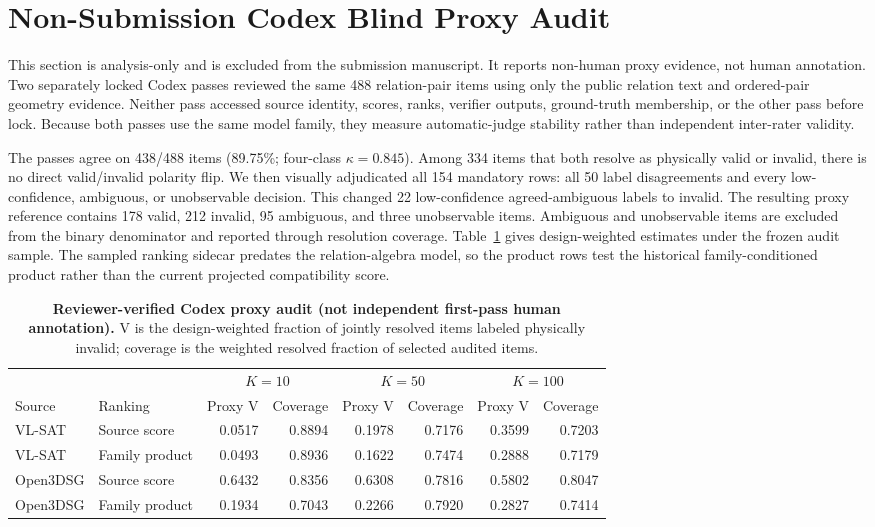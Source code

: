 \section{Non-Submission Codex Blind Proxy Audit}
\label{sec:codex-proxy}

This section is analysis-only and is excluded from the submission manuscript.
It reports non-human proxy evidence, not human annotation. Two separately
locked Codex passes reviewed the same 488 relation-pair items using only the
public relation text and ordered-pair geometry evidence. Neither pass accessed
source identity, scores, ranks, verifier outputs, ground-truth membership, or
the other pass before lock. Because both passes use the same model family, they
measure automatic-judge stability rather than independent inter-rater validity.

The passes agree on 438/488 items (89.75\%; four-class $\kappa=0.845$). Among
334 items that both resolve as physically valid or invalid, there is no direct
valid/invalid polarity flip. We then visually adjudicated all 154 mandatory
rows: all 50 label disagreements and every low-confidence, ambiguous, or
unobservable decision. This changed 22 low-confidence agreed-ambiguous labels
to invalid. The resulting proxy reference contains 178 valid, 212 invalid, 95
ambiguous, and three unobservable items. Ambiguous and unobservable items are
excluded from the binary denominator and reported through resolution coverage.
Table~\ref{tab:codex-proxy} gives design-weighted estimates under the frozen
audit sample. The sampled ranking sidecar predates the relation-algebra model,
so the product rows test the historical family-conditioned product rather than
the current projected compatibility score.

\begin{table}[t]
\centering
\small
\setlength{\tabcolsep}{5pt}
\caption{\textbf{Reviewer-verified Codex proxy audit (not independent
first-pass human annotation).} V is the
design-weighted fraction of jointly resolved items labeled physically invalid;
coverage is the weighted resolved fraction of selected audited items.}
\label{tab:codex-proxy}
\begin{tabular}{llrrrrrr}
\toprule
& & \multicolumn{2}{c}{$K=10$} & \multicolumn{2}{c}{$K=50$} & \multicolumn{2}{c}{$K=100$} \\
\cmidrule(lr){3-4}\cmidrule(lr){5-6}\cmidrule(lr){7-8}
Source & Ranking & Proxy V & Coverage & Proxy V & Coverage & Proxy V & Coverage \\
\midrule
VL-SAT & Source score & 0.0517 & 0.8894 & 0.1978 & 0.7176 & 0.3599 & 0.7203 \\
VL-SAT & Family product & 0.0493 & 0.8936 & 0.1622 & 0.7474 & 0.2888 & 0.7179 \\
Open3DSG & Source score & 0.6432 & 0.8356 & 0.6308 & 0.7816 & 0.5802 & 0.8047 \\
Open3DSG & Family product & 0.1934 & 0.7043 & 0.2266 & 0.7920 & 0.2827 & 0.7414 \\
\bottomrule
\end{tabular}
\end{table}

